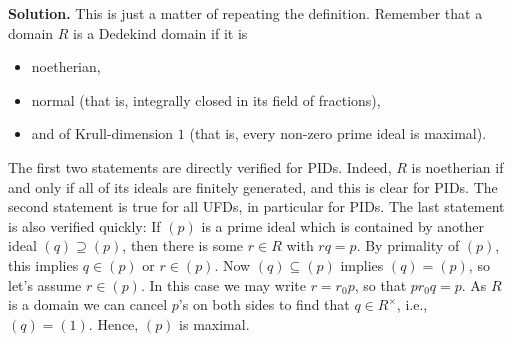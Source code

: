 \documentclass[a4paper,11pt]{article}
\begin{document}
\textbf{Solution.} This is just a matter of repeating the definition.
Remember that a domain $R$ is a Dedekind domain if it is
\begin{itemize}
    \item noetherian,
    \item normal (that is, integrally closed in its field of fractions),
    \item and of Krull-dimension $1$ (that is, every non-zero prime ideal is
        maximal).
\end{itemize}
The first two statements are directly verified for PIDs. Indeed, $R$ is
noetherian if and only if all of its ideals are finitely generated, and this is
clear for PIDs. The second statement is true for all UFDs, in particular for
PIDs. The last statement is also verified quickly: If $(p)$ is a prime ideal
which is contained by another ideal $(q)\supseteq (p)$, then there is some $r
\in R$ with
$rq = p$. By primality of $(p)$, this implies $q \in (p)$ or $r \in (p)$.
Now $(q) \subseteq (p)$ implies $(q) = (p)$, so let's assume $r \in (p)$. In this
case we may write $r = r_0 p$, so that $p r_0 q = p$. As $R$ is a domain we can
cancel $p$'s on both sides to find that $q \in R^\times$, i.e., $(q) = (1)$. 
Hence, $(p)$ is maximal.


\contactend
\end{document}
